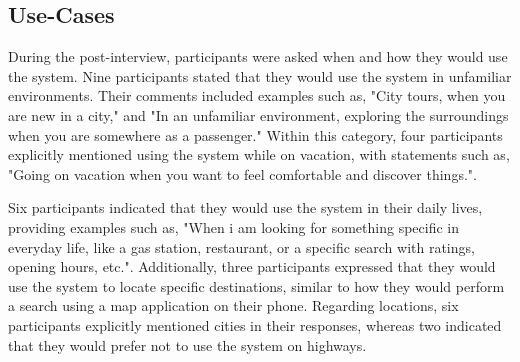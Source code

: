 \subsection{Use-Cases}
During the post-interview, participants were asked when and how they would use the system. Nine participants stated that they would use the system in unfamiliar environments. Their comments included examples such as, "City tours, when you are new in a city," and "In an unfamiliar environment, exploring the surroundings when you are somewhere as a passenger." Within this category, four participants explicitly mentioned using the system while on vacation, with statements such as, "Going on vacation when you want to feel comfortable and discover things.". 

Six participants indicated that they would use the system in their daily lives, providing examples such as, "When i am looking for something specific in everyday life, like a gas station, restaurant, or a specific search with ratings, opening hours, etc.". Additionally, three participants expressed that they would use the system to locate specific destinations, similar to how they would perform a search using a map application on their phone. Regarding locations, six participants explicitly mentioned cities in their responses, whereas two indicated that they would prefer not to use the system on highways.

